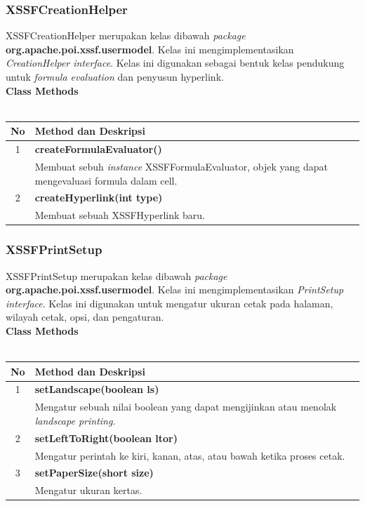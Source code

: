 \subsubsection{XSSFCreationHelper}
XSSFCreationHelper merupakan kelas dibawah \textit{package} \textbf{org.apache.poi.xssf.usermodel}. Kelas ini mengimplementasikan \textit{CreationHelper interface}. Kelas ini digunakan sebagai bentuk kelas pendukung untuk \textit{formula evaluation} dan penyusun hyperlink.\cite{apachepoi2}
\\
\noindent \textbf{Class Methods}\\ \\
	\begin{tabular}{|c|p{12cm}|}
		\hline
		\textbf{No} & \textbf{Method dan Deskripsi} \\ \hline \hline
		1 & \textbf{createFormulaEvaluator()}\\
			&	Membuat sebuh \textit{instance} XSSFFormulaEvaluator, objek yang dapat mengevaluasi formula dalam cell.\\ \hline
		2 & \textbf{createHyperlink(int type)}\\
			&	Membuat sebuah XSSFHyperlink baru.\\ \hline
	\end{tabular}

\subsubsection{XSSFPrintSetup}
XSSFPrintSetup merupakan kelas dibawah \textit{package} \textbf{org.apache.poi.xssf.usermodel}. Kelas ini mengimplementasikan \textit{PrintSetup interface}. Kelas ini digunakan untuk mengatur ukuran cetak pada halaman, wilayah cetak, opsi, dan pengaturan.\cite{tutpoint}
\\
\noindent \textbf{Class Methods}\\ \\
	\begin{tabular}{|c|p{12cm}|}
		\hline
		\textbf{No} & \textbf{Method dan Deskripsi} \\ \hline \hline
		1 & \textbf{setLandscape(boolean ls)}\\
			&	Mengatur sebuah nilai boolean yang dapat mengijinkan atau menolak \textit{landscape printing}.\\ \hline
		2 & \textbf{setLeftToRight(boolean ltor)}\\
			&	Mengatur perintah ke kiri, kanan, atas, atau bawah ketika proses cetak.\\ \hline
		3 & \textbf{setPaperSize(short size)}\\
			&	Mengatur ukuran kertas.\\ \hline
	\end{tabular}
	
